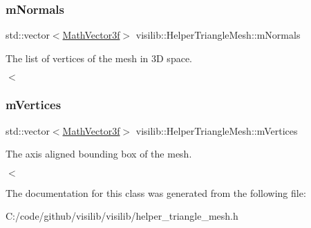 \subsubsection{\texorpdfstring{mNormals}{mNormals}}
{\footnotesize\ttfamily std\+::vector$<$\mbox{\hyperlink{classvisilib_1_1_math_vector3__}{Math\+Vector3f}}$>$ visilib\+::\+Helper\+Triangle\+Mesh\+::m\+Normals\hspace{0.3cm}{\ttfamily [private]}}



The list of vertices of the mesh in 3D space. 

$<$ \mbox{\label{classvisilib_1_1_helper_triangle_mesh_a90a6fc1de5c582c0bf0ab0002459ff56}} 
\subsubsection{\texorpdfstring{mVertices}{mVertices}}
{\footnotesize\ttfamily std\+::vector$<$\mbox{\hyperlink{classvisilib_1_1_math_vector3__}{Math\+Vector3f}}$>$ visilib\+::\+Helper\+Triangle\+Mesh\+::m\+Vertices\hspace{0.3cm}{\ttfamily [private]}}



The axis aligned bounding box of the mesh. 

$<$ 

The documentation for this class was generated from the following file\+:\begin{DoxyCompactItemize}
\item 
C\+:/code/github/visilib/visilib/helper\+\_\+triangle\+\_\+mesh.\+h\end{DoxyCompactItemize}
